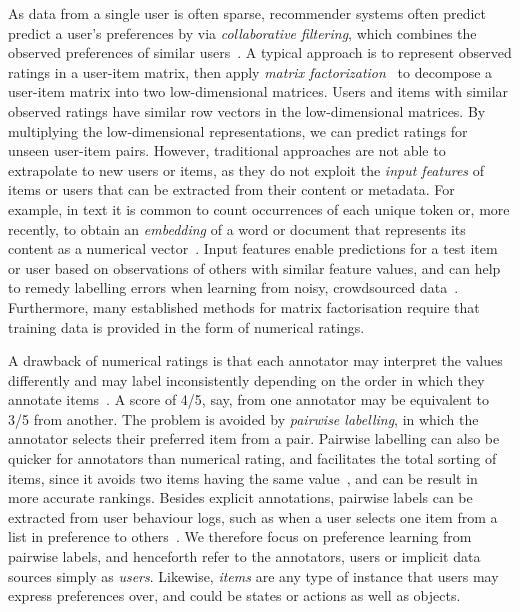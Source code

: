 As data from a single user is often sparse,
recommender systems often %
predict predict a user's preferences by 
via \emph{collaborative filtering},  
which combines the observed preferences of similar users~\citep{resnick1997recommender}.
A typical approach is to represent observed ratings in a user-item matrix,
then apply \emph{matrix factorization}~\citep{koren2009matrix}
to decompose a user-item matrix into two low-dimensional matrices.
Users and items with similar observed ratings have similar row vectors in the low-dimensional
matrices. By multiplying the low-dimensional representations, we can predict ratings for unseen
user-item pairs. 
However, traditional approaches 
are not able to extrapolate to new users or items,
as they do not exploit the \emph{input features} of items or users
that can be extracted from their content or metadata.
For example, in text it is common to count occurrences of each unique token
or, more recently, to obtain an \emph{embedding} of a word or document that
represents its content as a numerical vector~\citep{mikolov2013distributed,devlin2018bert}.
Input features enable predictions for a test item or user 
based on observations of others with similar feature values,
and can help to remedy labelling errors when learning from noisy, crowdsourced data~\citep{felt2016semantic,simpson2015language}.
Furthermore,
many established methods for matrix factorisation 
require that training data is provided in the form of numerical ratings.

A drawback of numerical ratings is that 
each annotator may interpret the values differently and may label inconsistently depending on the order in which they annotate items~\citep{ovadia2004ratings,yannakakis2011ranking}.
A score of 4/5, say, from one annotator may be equivalent to 3/5 from another. 
The problem is avoided by \emph{pairwise labelling}, 
in which the annotator selects their preferred item from a pair.
Pairwise labelling can also be quicker for annotators than numerical rating,
and facilitates the total sorting of items, since it avoids two items having the same value~\citep{kendall1948rank,kingsley2010preference,yang2011ranking},
and can be result in more accurate rankings\citep{kiritchenko2017best}.
Besides explicit annotations, pairwise labels can be extracted from
user behaviour logs, such as when a user selects one item from a list in preference
to others~\citep{joachims2002optimizing}. 
We therefore focus on preference learning from pairwise labels,
and henceforth refer to the annotators, users or implicit data sources simply as \emph{users}.
Likewise, \emph{items} are any type of instance that users may express preferences over,
and could be states or actions as well as objects.

